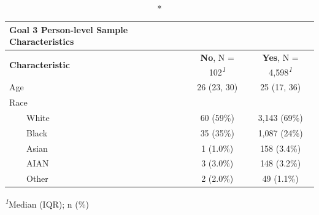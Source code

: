 \setlength{\LTpost}{0mm}
\begin{longtable}{lcc}
\caption*{
{\large \textbf{Goal 3 Person-level Sample Characteristics}}
} \\ 
\toprule
\textbf{Characteristic} & \textbf{No}, N = 102\textsuperscript{\textit{1}} & \textbf{Yes}, N = 4,598\textsuperscript{\textit{1}} \\ 
\midrule\addlinespace[2.5pt]
Age & 26 (23, 30) & 25 (17, 36) \\ 
Race &  &  \\ 
    White & 60 (59\%) & 3,143 (69\%) \\ 
    Black & 35 (35\%) & 1,087 (24\%) \\ 
    Asian & 1 (1.0\%) & 158 (3.4\%) \\ 
    AIAN & 3 (3.0\%) & 148 (3.2\%) \\ 
    Other & 2 (2.0\%) & 49 (1.1\%) \\ 
\bottomrule
\end{longtable}
\begin{minipage}{\linewidth}
\textsuperscript{\textit{1}}Median (IQR); n (\%)\\
\end{minipage}

